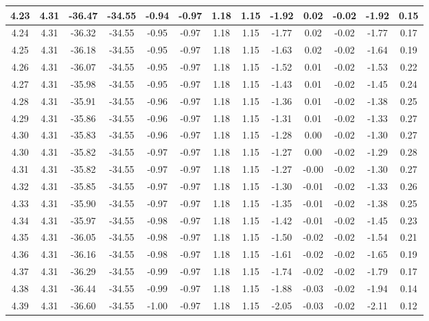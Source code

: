 \begin{table}[htbp]
\begin{adjustbox}{angle=90}
\begin{tabular}{|c|c|c|c|c|c|c|c|c|c|c|c|c|}
 4.23 & 4.31 & -36.47 & -34.55 & -0.94 & -0.97 & 1.18 & 1.15 & -1.92 & 0.02 & -0.02 & -1.92 & 0.15\\ \hline
 4.24 & 4.31 & -36.32 & -34.55 & -0.95 & -0.97 & 1.18 & 1.15 & -1.77 & 0.02 & -0.02 & -1.77 & 0.17\\ \hline
 4.25 & 4.31 & -36.18 & -34.55 & -0.95 & -0.97 & 1.18 & 1.15 & -1.63 & 0.02 & -0.02 & -1.64 & 0.19\\ \hline
 4.26 & 4.31 & -36.07 & -34.55 & -0.95 & -0.97 & 1.18 & 1.15 & -1.52 & 0.01 & -0.02 & -1.53 & 0.22\\ \hline
 4.27 & 4.31 & -35.98 & -34.55 & -0.95 & -0.97 & 1.18 & 1.15 & -1.43 & 0.01 & -0.02 & -1.45 & 0.24\\ \hline
 4.28 & 4.31 & -35.91 & -34.55 & -0.96 & -0.97 & 1.18 & 1.15 & -1.36 & 0.01 & -0.02 & -1.38 & 0.25\\ \hline
 4.29 & 4.31 & -35.86 & -34.55 & -0.96 & -0.97 & 1.18 & 1.15 & -1.31 & 0.01 & -0.02 & -1.33 & 0.27\\ \hline
 4.30 & 4.31 & -35.83 & -34.55 & -0.96 & -0.97 & 1.18 & 1.15 & -1.28 & 0.00 & -0.02 & -1.30 & 0.27\\ \hline
 4.30 & 4.31 & -35.82 & -34.55 & -0.97 & -0.97 & 1.18 & 1.15 & -1.27 & 0.00 & -0.02 & -1.29 & 0.28\\ \hline
 4.31 & 4.31 & -35.82 & -34.55 & -0.97 & -0.97 & 1.18 & 1.15 & -1.27 & -0.00 & -0.02 & -1.30 & 0.27\\ \hline
 4.32 & 4.31 & -35.85 & -34.55 & -0.97 & -0.97 & 1.18 & 1.15 & -1.30 & -0.01 & -0.02 & -1.33 & 0.26\\ \hline
 4.33 & 4.31 & -35.90 & -34.55 & -0.97 & -0.97 & 1.18 & 1.15 & -1.35 & -0.01 & -0.02 & -1.38 & 0.25\\ \hline
 4.34 & 4.31 & -35.97 & -34.55 & -0.98 & -0.97 & 1.18 & 1.15 & -1.42 & -0.01 & -0.02 & -1.45 & 0.23\\ \hline
 4.35 & 4.31 & -36.05 & -34.55 & -0.98 & -0.97 & 1.18 & 1.15 & -1.50 & -0.02 & -0.02 & -1.54 & 0.21\\ \hline
 4.36 & 4.31 & -36.16 & -34.55 & -0.98 & -0.97 & 1.18 & 1.15 & -1.61 & -0.02 & -0.02 & -1.65 & 0.19\\ \hline
 4.37 & 4.31 & -36.29 & -34.55 & -0.99 & -0.97 & 1.18 & 1.15 & -1.74 & -0.02 & -0.02 & -1.79 & 0.17\\ \hline
 4.38 & 4.31 & -36.44 & -34.55 & -0.99 & -0.97 & 1.18 & 1.15 & -1.88 & -0.03 & -0.02 & -1.94 & 0.14\\ \hline
 4.39 & 4.31 & -36.60 & -34.55 & -1.00 & -0.97 & 1.18 & 1.15 & -2.05 & -0.03 & -0.02 & -2.11 & 0.12\\ \hline

\end{tabular}
\end{adjustbox}
\end{table}
